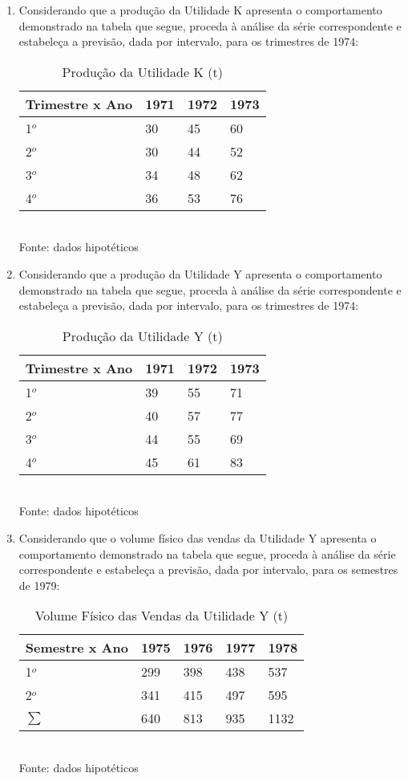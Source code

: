 \begin{enumerate}[resume]
\item Considerando que a produção da Utilidade K apresenta o comportamento demonstrado na tabela que segue, proceda à análise da série correspondente e estabeleça a previsão, dada por intervalo, para os trimestres de 1974:
	\begin{table}[!htb]
	\centering
	\caption{Produção da Utilidade K (t)}
	\vspace{0.5cm}
	\begin{tabular}{llll}
	Trimestre x Ano & 1971 & 1972 & 1973 \\
	\hline 
	1$^o$ & 30 & 45 & 60 \\
	2$^o$ & 30 & 44 & 52 \\
	3$^o$ & 34 & 48 & 62 \\
	4$^o$ & 36 & 53 & 76 \\	
	\end{tabular}\\
	Fonte: dados hipotéticos
	\end{table}	
	
\item Considerando que a produção da Utilidade Y apresenta o comportamento demonstrado na tabela que segue, proceda à análise da série correspondente e estabeleça a previsão, dada por intervalo, para os trimestres de 1974:
	\begin{table}[!htb]
	\centering
	\caption{Produção da Utilidade Y (t)}
	\vspace{0.5cm}
	\begin{tabular}{llll}
	Trimestre x Ano & 1971 & 1972 & 1973 \\
	\hline 
	1$^o$ & 39 & 55 & 71 \\
	2$^o$ & 40 & 57 & 77 \\
	3$^o$ & 44 & 55 & 69 \\
	4$^o$ & 45 & 61 & 83 \\	
	\end{tabular}\\
	Fonte: dados hipotéticos
	\end{table}			
	
\item Considerando que o volume físico das vendas da Utilidade Y apresenta o comportamento demonstrado na tabela que segue, proceda à análise da série correspondente e estabeleça a previsão, dada por intervalo, para os semestres de 1979:
	\begin{table}[!htb]
	\centering
	\caption{Volume Físico das Vendas da Utilidade Y (t)}
	\vspace{0.5cm}
	\begin{tabular}{lllll}
	Semestre x Ano & 1975 & 1976 & 1977 & 1978 \\
	\hline 
	1$^o$ & 299 & 398 & 438 & 537 \\
	2$^o$ & 341 & 415 & 497 & 595 \\
	\hline 
	$\sum$ & 640 & 813 & 935 & 1132\\
	\end{tabular}\\
	Fonte: dados hipotéticos
	\end{table}		
	

\end{enumerate}
